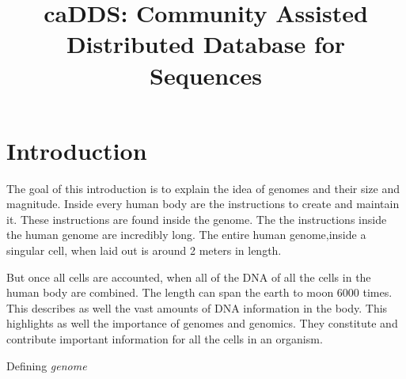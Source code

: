 \documentclass{article}
\begin{document}

\title{caDDS: Community Assisted Distributed Database for Sequences}

\author{
\and
{}
}

\maketitle

\section{Introduction}
The goal of this introduction is to explain the idea of genomes and their size and magnitude. Inside every human body are the instructions to create and maintain it. These instructions are found inside the genome. The the instructions inside the human genome are incredibly long. The entire human genome,inside a singular cell, when laid out is around 2 meters in length. \autocite{ency_sci_tech}

But once all cells are accounted, when all of the DNA of all the cells in the human body are combined. The length can span the earth to moon 6000 times. This describes as well the vast amounts of DNA information in the body. This highlights as well the importance of genomes and genomics. They constitute and contribute important information for all the cells in an organism.


Defining \textit{genome}
\end{document}
